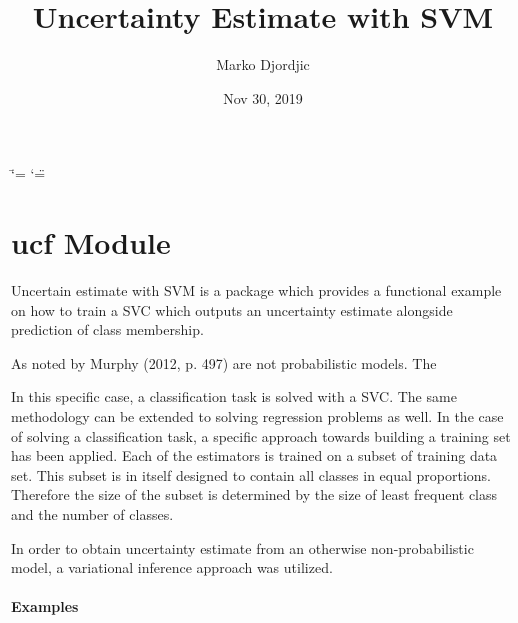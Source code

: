 \documentclass[a4paper,10pt,english]{sphinxmanual}
\title{Uncertainty Estimate with SVM}
\date{Nov 30, 2019}
\author{Marko Djordjic}
\begin{document}
\ifdefined\shorthandoff
  \ifnum\catcode`\=\string=\active\shorthandoff{=}\fi
  \ifnum\catcode`\"=\active{}\fi
\fi

\pagestyle{empty}
\sphinxmaketitle
\pagestyle{plain}
\sphinxtableofcontents
\pagestyle{normal}
\label{\detokenize{index::doc}}



\chapter{ucf Module}
\label{\detokenize{index:module-ucf}}\label{\detokenize{index:ucf-module}}
Uncertain estimate with SVM is a package which provides a functional
example on how to train a SVC which outputs an uncertainty estimate
alongside prediction of class membership.

As noted by Murphy (2012, p. 497) are not probabilistic models. The

In this specific case, a classification task is solved with a SVC. The
same methodology can be extended to solving regression problems as well.
In the case of solving a classification task, a specific approach towards
building a training set has been applied. Each of the estimators is trained
on a subset of training data set. This subset is in itself designed to
contain all classes in equal proportions. Therefore the size of the subset
is determined by the size of least frequent class and the number of classes.

In order to obtain uncertainty estimate from an otherwise non-probabilistic
model, a variational inference approach was utilized.
\subsubsection*{Examples}
\end{document}

